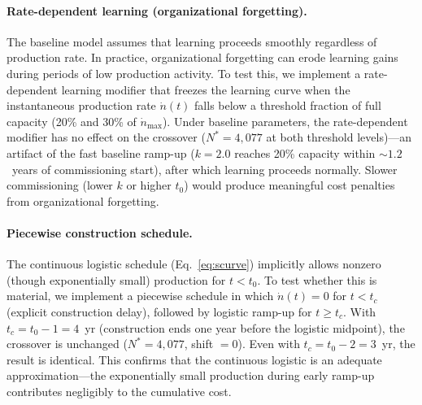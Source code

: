 \documentclass[preprint,12pt]{elsarticle}
\begin{document}
\paragraph{Rate-dependent learning (organizational forgetting).} The baseline model assumes that learning proceeds smoothly regardless of production rate. In practice, organizational forgetting \cite{benkard2000,thompson2012} can erode learning gains during periods of low production activity. To test this, we implement a rate-dependent learning modifier that freezes the learning curve when the instantaneous production rate $\dot{n}(t)$ falls below a threshold fraction of full capacity (20\% and 30\% of $\dot{n}_{\max}$). Under baseline parameters, the rate-dependent modifier has no effect on the crossover ($N^* = 4{,}077$ at both threshold levels)---an artifact of the fast baseline ramp-up ($k = 2.0$ reaches 20\% capacity within ${\sim}1.2$~years of commissioning start), after which learning proceeds normally. Slower commissioning (lower $k$ or higher $t_0$) would produce meaningful cost penalties from organizational forgetting.

\paragraph{Piecewise construction schedule.} The continuous logistic schedule (Eq.~\ref{eq:scurve}) implicitly allows nonzero (though exponentially small) production for $t < t_0$. To test whether this is material, we implement a piecewise schedule in which $\dot{n}(t) = 0$ for $t < t_c$ (explicit construction delay), followed by logistic ramp-up for $t \geq t_c$. With $t_c = t_0 - 1 = 4$~yr (construction ends one year before the logistic midpoint), the crossover is unchanged ($N^* = 4{,}077$, shift $= 0$). Even with $t_c = t_0 - 2 = 3$~yr, the result is identical. This confirms that the continuous logistic is an adequate approximation---the exponentially small production during early ramp-up contributes negligibly to the cumulative cost.
\end{document}
